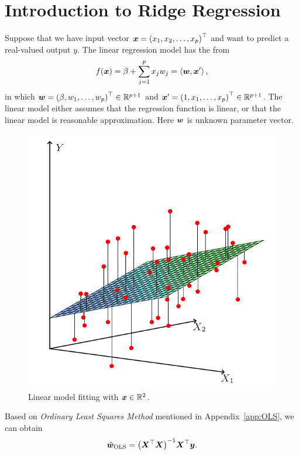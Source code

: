 \section{Introduction to Ridge Regression}

Suppose that we have input vector \(\bm{x} = {(x_1, x_2, \dots, x_p)}^\top\) and want
to predict a real-valued output \(y\). The linear regression model has the from
\begin{equation}\label{eq:lin-reg}
    f(\bm{x}) = \beta + \sum_{j=1}^p x_j w_j = \left\langle \bm{w},\bm{x}' \right\rangle,
\end{equation}
in which \(\bm{w} = {(\beta, w_1, \dots, w_p)}^\top \in \mathbb{R}^{p+1}\) and 
\(\bm{x}' = {(1, x_1, \dots, x_p)}^\top \in \mathbb{R}^{p+1}\). The linear model either assumes that
the regression function is linear, or that the linear model is reasonable approximation.
Here \(\bm{w}\) is unknown parameter vector.

\begin{figure}[!htbp]
    \centering
    \includegraphics[scale = 0.3]{fig/linear-model.png}
    \caption{Linear model fitting with \(\bm{x} \in \mathbb{R}^2\).}\label{fig:linear-model}
\end{figure}

Based on \emph{Ordinary Least Squares Method} mentioned in Appendix~\ref{app:OLS}, we can obtain
\begin{equation}\label{eq:solution-OLS}
    \hat{\bm{w}}_{\text{OLS}} = {\left(\bm{X}^\top \bm{X}\right)}^{-1} \bm{X}^\top \bm{y}.
\end{equation}

